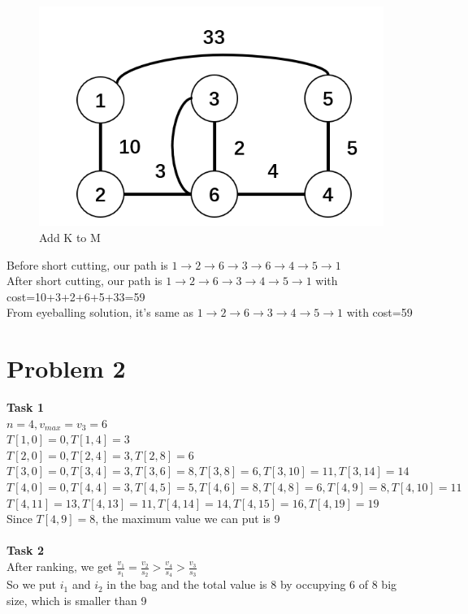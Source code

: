 \documentclass[a4paper]{article}
\begin{document}
\begin{figure}[H]
    \centering
    \includegraphics[scale=0.25]{P5.png}
    \caption{Add K to M}
\end{figure}
Before short cutting, our path is $1\rightarrow2\rightarrow6\rightarrow3\rightarrow6\rightarrow4\rightarrow5\rightarrow1$
\\After short cutting, our path is
$1\rightarrow2\rightarrow6\rightarrow3\rightarrow4\rightarrow5\rightarrow1$ with cost=10+3+2+6+5+33=59
\\From eyeballing solution, it's same as $1\rightarrow2\rightarrow6\rightarrow3\rightarrow4\rightarrow5\rightarrow1$ with cost=59
\section{Problem 2}
\noindent \textbf{Task 1}\\
$n=4,v_{max}=v_3=6$
\\$T[1,0]=0,T[1,4]=3$
\\$T[2,0]=0,T[2,4]=3,T[2,8]=6$
\\$T[3,0]=0,T[3,4]=3,T[3,6]=8,T[3,8]=6,T[3,10]=11,T[3,14]=14$
\\$T[4,0]=0,T[4,4]=3,T[4,5]=5,T[4,6]=8,T[4,8]=6,T[4,9]=8,T[4,10]=11$
\\$T[4,11]=13,T[4,13]=11,T[4,14]=14,T[4,15]=16,T[4,19]=19$
\\Since $T[4,9]=8$, the maximum value we can put is 9
\\\\ \textbf{Task 2}
\\After ranking, we get $\frac{v_1}{s_1}=\frac{v_2}{s_2}>\frac{v_4}{s_4}>\frac{v_3}{s_3}$
\\So we put $i_1$ and $i_2$ in the bag and the total value is 8 by occupying 6 of 8 big size, which is smaller than 9
\end{document}
